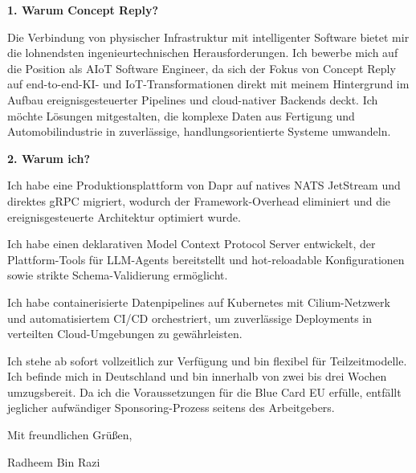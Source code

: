 \documentclass[11pt,a4paper]{coverletter}
\begin{document}
\vspace{8pt}\noindent\textbf{1. Warum Concept Reply?}\par\vspace{3pt}

Die Verbindung von physischer Infrastruktur mit intelligenter Software bietet mir die lohnendsten ingenieurtechnischen Herausforderungen. Ich bewerbe mich auf die Position als AIoT Software Engineer, da sich der Fokus von Concept Reply auf end-to-end-KI- und IoT-Transformationen direkt mit meinem Hintergrund im Aufbau ereignisgesteuerter Pipelines und cloud-nativer Backends deckt. Ich möchte Lösungen mitgestalten, die komplexe Daten aus Fertigung und Automobilindustrie in zuverlässige, handlungsorientierte Systeme umwandeln.

\vspace{8pt}\noindent\textbf{2. Warum ich?}\par\vspace{3pt}

\bullets

  \item Ich habe eine Produktionsplattform von Dapr auf natives NATS JetStream und direktes gRPC migriert, wodurch der Framework-Overhead eliminiert und die ereignisgesteuerte Architektur optimiert wurde.

  \item Ich habe einen deklarativen Model Context Protocol Server entwickelt, der Plattform-Tools für LLM-Agents bereitstellt und hot-reloadable Konfigurationen sowie strikte Schema-Validierung ermöglicht.

  \item Ich habe containerisierte Datenpipelines auf Kubernetes mit Cilium-Netzwerk und automatisiertem CI/CD orchestriert, um zuverlässige Deployments in verteilten Cloud-Umgebungen zu gewährleisten.

\bulletsend

Ich stehe ab sofort vollzeitlich zur Verfügung und bin flexibel für Teilzeitmodelle. Ich befinde mich in Deutschland und bin innerhalb von zwei bis drei Wochen umzugsbereit. Da ich die Voraussetzungen für die Blue Card EU erfülle, entfällt jeglicher aufwändiger Sponsoring-Prozess seitens des Arbeitgebers.

\closing{Mit freundlichen Grüßen,}{Radheem Bin Razi}
\end{document}
